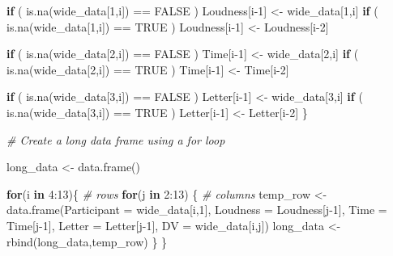 \documentclass[
]{book}
\newenvironment{Shaded}{\begin{snugshade}}{\end{snugshade}}
\newcommand{\AttributeTok}[1]{\textcolor[rgb]{0.77,0.63,0.00}{#1}}
\newcommand{\CommentTok}[1]{\textcolor[rgb]{0.56,0.35,0.01}{\textit{#1}}}
\newcommand{\ConstantTok}[1]{\textcolor[rgb]{0.00,0.00,0.00}{#1}}
\newcommand{\ControlFlowTok}[1]{\textcolor[rgb]{0.13,0.29,0.53}{\textbf{#1}}}
\newcommand{\DecValTok}[1]{\textcolor[rgb]{0.00,0.00,0.81}{#1}}
\newcommand{\FunctionTok}[1]{\textcolor[rgb]{0.00,0.00,0.00}{#1}}
\newcommand{\NormalTok}[1]{#1}
\newcommand{\OtherTok}[1]{\textcolor[rgb]{0.56,0.35,0.01}{#1}}
\newcommand{\SpecialCharTok}[1]{\textcolor[rgb]{0.00,0.00,0.00}{#1}}
\theoremstyle{definition}
\theoremstyle{definition}
\theoremstyle{definition}
\theoremstyle{definition}
\theoremstyle{remark}
\begin{document}
\begin{Shaded}
\begin{Highlighting}[]
  \ControlFlowTok{if}\NormalTok{ ( }\FunctionTok{is.na}\NormalTok{(wide\_data[}\DecValTok{1}\NormalTok{,i]) }\SpecialCharTok{==} \ConstantTok{FALSE}\NormalTok{ ) Loudness[i}\DecValTok{{-}1}\NormalTok{] }\OtherTok{\textless{}{-}}\NormalTok{ wide\_data[}\DecValTok{1}\NormalTok{,i]}
  \ControlFlowTok{if}\NormalTok{ ( }\FunctionTok{is.na}\NormalTok{(wide\_data[}\DecValTok{1}\NormalTok{,i]) }\SpecialCharTok{==} \ConstantTok{TRUE}\NormalTok{ ) Loudness[i}\DecValTok{{-}1}\NormalTok{] }\OtherTok{\textless{}{-}}\NormalTok{ Loudness[i}\DecValTok{{-}2}\NormalTok{]}
  
  \ControlFlowTok{if}\NormalTok{ ( }\FunctionTok{is.na}\NormalTok{(wide\_data[}\DecValTok{2}\NormalTok{,i]) }\SpecialCharTok{==} \ConstantTok{FALSE}\NormalTok{ ) Time[i}\DecValTok{{-}1}\NormalTok{] }\OtherTok{\textless{}{-}}\NormalTok{ wide\_data[}\DecValTok{2}\NormalTok{,i]}
  \ControlFlowTok{if}\NormalTok{ ( }\FunctionTok{is.na}\NormalTok{(wide\_data[}\DecValTok{2}\NormalTok{,i]) }\SpecialCharTok{==} \ConstantTok{TRUE}\NormalTok{ ) Time[i}\DecValTok{{-}1}\NormalTok{] }\OtherTok{\textless{}{-}}\NormalTok{ Time[i}\DecValTok{{-}2}\NormalTok{]}
  
  \ControlFlowTok{if}\NormalTok{ ( }\FunctionTok{is.na}\NormalTok{(wide\_data[}\DecValTok{3}\NormalTok{,i]) }\SpecialCharTok{==} \ConstantTok{FALSE}\NormalTok{ ) Letter[i}\DecValTok{{-}1}\NormalTok{] }\OtherTok{\textless{}{-}}\NormalTok{ wide\_data[}\DecValTok{3}\NormalTok{,i]}
  \ControlFlowTok{if}\NormalTok{ ( }\FunctionTok{is.na}\NormalTok{(wide\_data[}\DecValTok{3}\NormalTok{,i]) }\SpecialCharTok{==} \ConstantTok{TRUE}\NormalTok{ ) Letter[i}\DecValTok{{-}1}\NormalTok{] }\OtherTok{\textless{}{-}}\NormalTok{ Letter[i}\DecValTok{{-}2}\NormalTok{]}
\NormalTok{\}}

\CommentTok{\# Create a long data frame using a for loop}

\NormalTok{long\_data }\OtherTok{\textless{}{-}}  \FunctionTok{data.frame}\NormalTok{()}

\ControlFlowTok{for}\NormalTok{(i }\ControlFlowTok{in} \DecValTok{4}\SpecialCharTok{:}\DecValTok{13}\NormalTok{)\{ }\CommentTok{\# rows}
  \ControlFlowTok{for}\NormalTok{(j }\ControlFlowTok{in} \DecValTok{2}\SpecialCharTok{:}\DecValTok{13}\NormalTok{) \{ }\CommentTok{\# columns}
\NormalTok{    temp\_row }\OtherTok{\textless{}{-}} \FunctionTok{data.frame}\NormalTok{(}\AttributeTok{Participant =}\NormalTok{ wide\_data[i,}\DecValTok{1}\NormalTok{],}
                           \AttributeTok{Loudness =}\NormalTok{ Loudness[j}\DecValTok{{-}1}\NormalTok{],}
                           \AttributeTok{Time =}\NormalTok{ Time[j}\DecValTok{{-}1}\NormalTok{],}
                           \AttributeTok{Letter =}\NormalTok{ Letter[j}\DecValTok{{-}1}\NormalTok{],}
                           \AttributeTok{DV =}\NormalTok{ wide\_data[i,j])}
\NormalTok{    long\_data }\OtherTok{\textless{}{-}} \FunctionTok{rbind}\NormalTok{(long\_data,temp\_row)}
\NormalTok{  \}}
\NormalTok{\}}


\end{Highlighting}
\end{Shaded}
\end{document}

